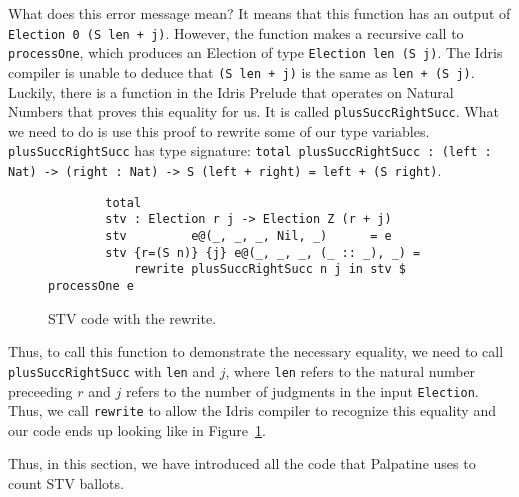 What does this error message mean? It means that this function has an output of
\texttt{Election 0 (S len + j)}. However, the function makes a recursive call to
\texttt{processOne}, which produces an Election of type \texttt{Election len (S
j)}. The Idris compiler is unable to deduce that \texttt{(S len + j)} is the
same as \texttt{len + (S j)}. Luckily, there is a function in the Idris Prelude
that operates on Natural Numbers that proves this equality for us. It is called
\texttt{plusSuccRightSucc}. What we need to do is use this proof to rewrite some
of our type variables. \texttt{plusSuccRightSucc} has type signature:
\texttt{total plusSuccRightSucc : (left : Nat) -> (right : Nat) -> S (left +
right) = left + (S right)}. 

\begin{figure}[ht!!!!!!!!]
	\caption{STV code with the rewrite.}
	\label{with_rewrite_code}
	\begin{lstlisting}
        total
        stv : Election r j -> Election Z (r + j)
        stv         e@(_, _, _, Nil, _)      = e
        stv {r=(S n)} {j} e@(_, _, _, (_ :: _), _) = 
            rewrite plusSuccRightSucc n j in stv $ processOne e
    \end{lstlisting}
\end{figure}

Thus, to call this function to demonstrate the necessary equality, we need to
call \texttt{plusSuccRightSucc} with \texttt{len} and $j$, where \texttt{len}
refers to the natural number preceeding $r$ and $j$ refers to the number of
judgments in the input \texttt{Election}. Thus, we call \texttt{rewrite} to
allow the Idris compiler to recognize this equality and our code ends up looking
like in Figure~\ref{with_rewrite_code}. 

Thus, in this section, we have introduced all the code that Palpatine uses to
count STV ballots. 